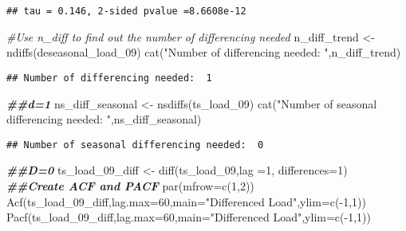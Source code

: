 \documentclass[
]{article}
\newenvironment{Shaded}{\begin{snugshade}}{\end{snugshade}}
\newcommand{\AttributeTok}[1]{\textcolor[rgb]{0.77,0.63,0.00}{#1}}
\newcommand{\CommentTok}[1]{\textcolor[rgb]{0.56,0.35,0.01}{\textit{#1}}}
\newcommand{\DecValTok}[1]{\textcolor[rgb]{0.00,0.00,0.81}{#1}}
\newcommand{\DocumentationTok}[1]{\textcolor[rgb]{0.56,0.35,0.01}{\textbf{\textit{#1}}}}
\newcommand{\FunctionTok}[1]{\textcolor[rgb]{0.00,0.00,0.00}{#1}}
\newcommand{\NormalTok}[1]{#1}
\newcommand{\OtherTok}[1]{\textcolor[rgb]{0.56,0.35,0.01}{#1}}
\newcommand{\SpecialCharTok}[1]{\textcolor[rgb]{0.00,0.00,0.00}{#1}}
\newcommand{\StringTok}[1]{\textcolor[rgb]{0.31,0.60,0.02}{#1}}
\begin{document}
\begin{verbatim}
## tau = 0.146, 2-sided pvalue =8.6608e-12
\end{verbatim}

\begin{Shaded}
\begin{Highlighting}[]
\CommentTok{\#Use n\_diff to find out the number of differencing needed}
\NormalTok{n\_diff\_trend }\OtherTok{\textless{}{-}} \FunctionTok{ndiffs}\NormalTok{(deseasonal\_load\_09)}
\FunctionTok{cat}\NormalTok{(}\StringTok{"Number of differencing needed: "}\NormalTok{,n\_diff\_trend)}
\end{Highlighting}
\end{Shaded}

\begin{verbatim}
## Number of differencing needed:  1
\end{verbatim}

\begin{Shaded}
\begin{Highlighting}[]
\DocumentationTok{\#\#d=1}
\NormalTok{ns\_diff\_seasonal }\OtherTok{\textless{}{-}} \FunctionTok{nsdiffs}\NormalTok{(ts\_load\_09)}
\FunctionTok{cat}\NormalTok{(}\StringTok{"Number of seasonal differencing needed: "}\NormalTok{,ns\_diff\_seasonal)}
\end{Highlighting}
\end{Shaded}

\begin{verbatim}
## Number of seasonal differencing needed:  0
\end{verbatim}

\begin{Shaded}
\begin{Highlighting}[]
\DocumentationTok{\#\#D=0}
\NormalTok{ts\_load\_09\_diff }\OtherTok{\textless{}{-}} \FunctionTok{diff}\NormalTok{(ts\_load\_09,}\AttributeTok{lag =}\DecValTok{1}\NormalTok{, }\AttributeTok{differences=}\DecValTok{1}\NormalTok{) }
\DocumentationTok{\#\#Create ACF and PACF}
\FunctionTok{par}\NormalTok{(}\AttributeTok{mfrow=}\FunctionTok{c}\NormalTok{(}\DecValTok{1}\NormalTok{,}\DecValTok{2}\NormalTok{))}
\FunctionTok{Acf}\NormalTok{(ts\_load\_09\_diff,}\AttributeTok{lag.max=}\DecValTok{60}\NormalTok{,}\AttributeTok{main=}\StringTok{"Differenced Load"}\NormalTok{,}\AttributeTok{ylim=}\FunctionTok{c}\NormalTok{(}\SpecialCharTok{{-}}\DecValTok{1}\NormalTok{,}\DecValTok{1}\NormalTok{))}
\FunctionTok{Pacf}\NormalTok{(ts\_load\_09\_diff,}\AttributeTok{lag.max=}\DecValTok{60}\NormalTok{,}\AttributeTok{main=}\StringTok{"Differenced Load"}\NormalTok{,}\AttributeTok{ylim=}\FunctionTok{c}\NormalTok{(}\SpecialCharTok{{-}}\DecValTok{1}\NormalTok{,}\DecValTok{1}\NormalTok{))}
\end{Highlighting}
\end{Shaded}
\end{document}
